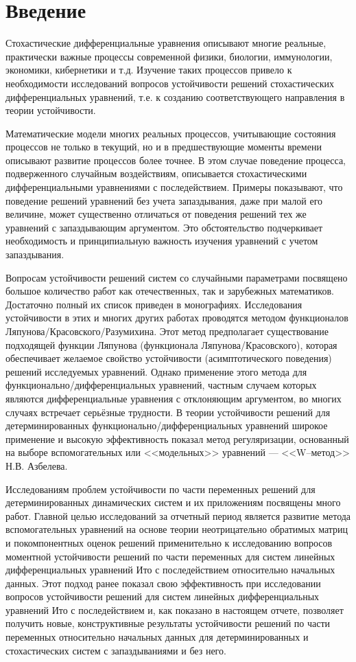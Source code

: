 \section*{Введение}

Стохастические дифференциальные уравнения
описывают многие реальные, практически важные процессы современной
физики, биологии, иммунологии, экономики, кибернетики и т.д.
Изучение таких процессов привело к необходимости исследований
вопросов устойчивости решений стохастических дифференциальных
уравнений, т.е. к созданию соответствующего направления в теории
устойчивости.

Математические модели многих реальных процессов, учитывающие
состояния процессов не только в текущий, но и в предшествующие
моменты времени описывают развитие процессов более точнее. В этом
случае поведение процесса, подверженного случайным воздействиям,
описывается стохастическими дифференциальными уравнениями с
последействием. Примеры показывают, что поведение решений уравнений
без учета запаздывания, даже при малой его величине, может
существенно отличаться от поведения решений тех же уравнений с
запаздывающим аргументом. Это обстоятельство подчеркивает
необходимость и принципиальную важность изучения уравнений с учетом
запаздывания.

Вопросам устойчивости решений систем со случайными параметрами
посвящено большое количество работ как отечественных, так и
зарубежных математиков. Достаточно полный их список приведен в
монографиях. Исследования устойчивости в этих и многих других
работах проводятся методом функционалов
Ляпунова\-/Красовского\-/Разумихина. Этот метод предполагает
существование подходящей функции Ляпунова (функционала
Ляпунова\-/Красовского), которая обеспечивает желаемое свойство
устойчивости (асимптотического поведения) решений исследуемых
уравнений. Однако применение этого метода для
функционально\-/дифференциальных уравнений, частным случаем которых
являются дифференциальные уравнения с отклоняющим аргументом, во
многих случаях встречает серьёзные трудности. В теории устойчивости
решений для детерминированных функционально\-/дифференциальных
уравнений широкое применение и высокую эффективность показал метод
регуляризации, основанный на выборе вспомогательных или <<модельных>> уравнений  --- <<W--метод>> Н.В. Азбелева.

Исследованиям проблем устойчивости  по части переменных  решений для
детерминированных динамических систем и их приложениям посвящены
много работ. Главной целью исследований за отчетный период является
развитие метода вспомогательных уравнений на основе теории
неотрицательно обратимых матриц и покомпонентных оценок решений
применительно к исследованию вопросов моментной устойчивости решений
по части переменных для систем линейных дифференциальных уравнений
Ито с последействием относительно начальных данных. Этот подход
ранее показал свою эффективность при исследовании вопросов
устойчивости решений для систем линейных дифференциальных уравнений
Ито с последействием и, как показано в настоящем отчете, позволяет
получить новые, конструктивные результаты устойчивости решений по
части переменных относительно начальных данных для детерминированных
и стохастических систем с запаздываниями и без него.

